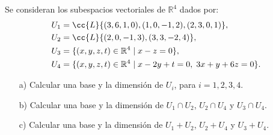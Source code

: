 \begin{ejercicio}
    Se consideran los subespacios vectoriales de \( \mathbb{R}^4 \) dados por:
\[
\begin{aligned}
U_1 &= \cc{L}\{(3,6,1,0), (1,0,-1,2), (2,3,0,1)\}, \\
U_2 &= \cc{L}\{(2,0,-1,3), (3,3,-2,4)\}, \\
U_3 &= \{(x,y,z,t) \in \mathbb{R}^4 \mid x - z = 0\}, \\
U_4 &= \{(x,y,z,t) \in \mathbb{R}^4 \mid x - 2y + t = 0, \; 3x + y + 6z= 0\}.
\end{aligned}
\]

\begin{enumerate}
    \item[a)] Calcular una base y la dimensión de \( U_i \), para \( i = 1, 2, 3, 4 \).
    \item[b)] Calcular una base y la dimensión de \( U_1 \cap U_2 \), \( U_2 \cap U_4 \) y \( U_3 \cap U_4 \).
    \item[c)] Calcular una base y la dimensión de \( U_1 + U_2 \), \( U_2 + U_4 \) y \( U_3 + U_4 \).
\end{enumerate}


\end{ejercicio}
